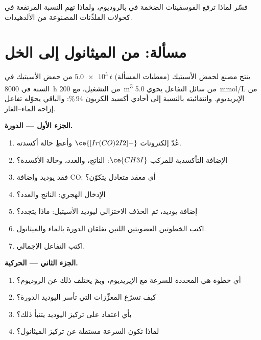 \begin{exercise}[$\star\star\star$]\label{exo:b3:homogeneous-catalysis:12}
فسّر لماذا ترفع الفوسفينات الضخمة  في 
بالروديوم، ولماذا تهم النسبة المرتفعة في كحولات الملدِّنات المصنوعة
من الألدهيدات.
\end{exercise}

\section{مسألة: من الميثانول إلى الخل}

\begin{problem}
\label{pb:b3:homogeneous-catalysis:1}
ينتج مصنع لحمض الأسيتيك (معطيات المسألة) $\qty{5.0e5}{t}$ من حمض الأسيتيك في السنة
في \qty{8000}{h} من التشغيل، مع \qty{200}{m^3} من سائل التفاعل يحوي \qty{5.0}{mmol/L} من
الإيريديوم. وانتقائيته بالنسبة إلى أحادي أكسيد الكربون 94\,\%: والباقي يحوّله
تفاعل إزاحة الماء--الغاز.

\medskip\noindent\textbf{الجزء الأول --- الدورة.}
\begin{enumerate}
  \item عُدّ إلكترونات $\ce{[Ir(CO)2I2]-}$ وأعطِ حالة أكسدته.
  \item الإضافة التأكسدية للمركب $\ce{CH3I}$: الناتج، والعدد، وحالة الأكسدة؟
  \item فقد يوديد وإضافة CO: أي معقد متعادل يتكوّن؟
  \item الإدخال الهجري: الناتج والعدد؟
  \item إضافة يوديد، ثم الحذف الاختزالي ليوديد الأسيتيل: ماذا
        يتجدد؟
  \item اكتب الخطوتين العضويتين اللتين تغلقان الدورة بالماء والميثانول.
  \item اكتب التفاعل الإجمالي.
\end{enumerate}

\medskip\noindent\textbf{الجزء الثاني --- الحركية.}
\begin{enumerate}[resume]
  \item أي خطوة هي المحددة للسرعة مع الإيريديوم، وبمَ يختلف ذلك عن
        الروديوم؟
  \item كيف تسرّع المعزِّزات التي تأسر اليوديد الدورة؟
  \item بأي اعتماد على تركيز اليوديد يتنبأ ذلك؟
  \item لماذا تكون السرعة مستقلة عن تركيز الميثانول؟
\end{enumerate}


\end{problem}
